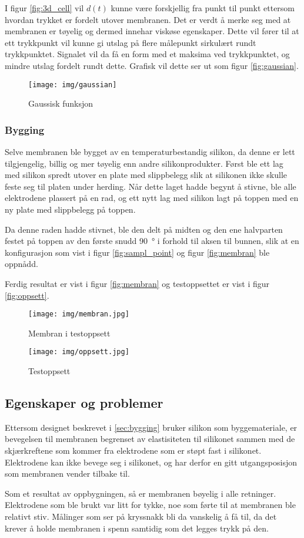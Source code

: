 I figur \vref{fig:3d_cell} vil \(d(t)\) kunne være forskjellig fra punkt til punkt ettersom hvordan trykket 
er fordelt utover membranen. Det er verdt å merke seg med at membranen er tøyelig og dermed innehar viskøse egenskaper. 
Dette vil fører til at ett trykkpunkt vil kunne gi utslag på flere målepunkt sirkulært rundt trykkpunktet. Signalet
vil da få en form med et maksima ved trykkpunktet, og mindre utslag fordelt rundt dette. Grafisk vil dette 
ser ut som figur \vref{fig:gaussian}.

\begin{figure}[htbp]
	\centering
	\texttt{[image: img/gaussian]}
	\caption{Gaussisk funksjon}
	\label{fig:gaussian}
\end{figure}

\subsubsection{Bygging}\label{sec:bygging}
Selve membranen ble bygget av en temperaturbestandig silikon, da denne er lett tilgjengelig, billig og mer tøyelig enn andre 
silikonprodukter. Først ble ett lag med silikon spredt utover en plate med slippbelegg slik at silikonen ikke skulle feste seg 
til platen under herding. Når dette laget hadde begynt å stivne, ble alle elektrodene plassert på en rad, og ett nytt lag med silikon lagt
på toppen med en ny plate med slippbelegg på toppen.

Da denne raden hadde stivnet, ble den delt på midten og den ene halvparten festet på toppen av den første 
snudd \SI{90}{\degree} i forhold til aksen til bunnen, slik at en konfigurasjon som vist i figur \vref{fig:sampl_point} og figur \vref{fig:membran} ble oppnådd.

Ferdig resultat er vist i figur \vref{fig:membran} og testoppsettet er vist i figur \vref{fig:oppsett}.

\begin{figure}[htbp]
	\centering
	\texttt{[image: img/membran.jpg]}
	\caption{Membran i testoppsett}
	\label{fig:membran}
\end{figure}

\begin{figure}[htbp]
	\centering
	\texttt{[image: img/oppsett.jpg]}
	\caption{Testoppsett}
	\label{fig:oppsett}
\end{figure}

\subsection{Egenskaper og problemer}
Ettersom designet beskrevet i \vref{sec:bygging} bruker silikon som byggemateriale, er bevegelsen til membranen begrenset av elastisiteten til silikonet sammen med 
de skjærkreftene som kommer fra elektrodene som er støpt fast i silikonet. Elektrodene kan ikke bevege seg i silikonet, og har derfor en gitt utgangsposisjon som 
membranen vender tilbake til.

Som et resultat av oppbygningen, så er membranen bøyelig i alle retninger. Elektrodene som ble brukt var litt for tykke, noe som førte til at 
membranen ble relativt stiv.
Målinger som ser på kryssnakk bli da vanskelig å få til, da det krever å holde membranen i spenn samtidig som det legges trykk på den.
